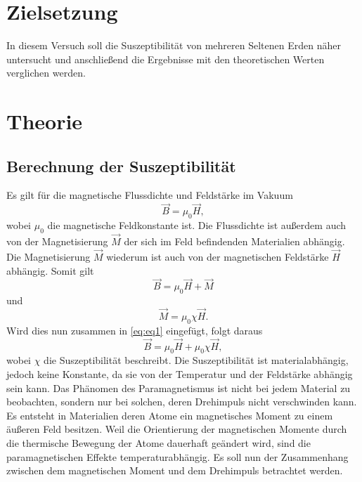 \section{Zielsetzung}
\label{sec:Zielsetzung}

In diesem Versuch soll die Suszeptibilität von mehreren Seltenen Erden näher untersucht und anschließend die Ergebnisse mit den theoretischen Werten verglichen werden.

\section{Theorie}
\label{sec:Theorie}
\subsection{Berechnung der Suszeptibilität}
\label{subsec: Berechnung}
Es gilt für die magnetische Flussdichte und Feldstärke im Vakuum
\begin{equation}
\label{eq:eq1}
\vec{B} = \mu_0 \vec{H},
\end{equation}
wobei $\mu_0$ die magnetische Feldkonstante ist. Die Flussdichte ist außerdem auch von der Magnetisierung $\vec{M}$ der sich im Feld befindenden Materialien abhängig. Die Magnetisierung
$\vec{M}$ wiederum ist auch von der magnetischen Feldstärke $\vec{H}$ abhängig. Somit gilt
\begin{equation}
\label{eq:eq2}
\vec{B} = \mu_0 \vec{H} + \vec{M}
\end{equation}
und
\begin{equation}
\vec{M} = \mu_0 \chi \vec{H}.
\end{equation}
Wird dies nun zusammen in \autoref{eq:eq1} eingefügt, folgt daraus
\begin{equation*}
\vec{B} = \mu_0 \vec{H} + \mu_0 \chi \vec{H},
\end{equation*}
wobei $\chi$ die Suszeptibilität beschreibt. Die Suszeptibilität ist materialabhängig, jedoch keine Konstante, da sie von der Temperatur und der Feldstärke abhängig sein kann. 
\newline
Das Phänomen des Paramagnetismus ist nicht bei jedem Material zu beobachten, sondern nur bei solchen, deren Drehimpuls nicht verschwinden kann.
Es entsteht in Materialien deren Atome ein magnetisches Moment zu einem äußeren Feld besitzen. Weil die Orientierung der magnetischen Momente durch die thermische Bewegung
der Atome dauerhaft geändert wird, sind die paramagnetischen Effekte temperaturabhängig.
\newline
Es soll nun der Zusammenhang zwischen dem magnetischen Moment und dem Drehimpuls betrachtet werden.
